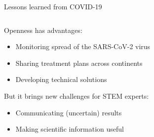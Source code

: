 
\begin{frame}{Lessons learned from COVID-19}

\begin{columns}[t]
    \begin{column}{.5\textwidth}   
        Openness has advantages:
        
        \begin{itemize}
            \item Monitoring spread of the SARS-CoV-2 virus
            \item Sharing treatment plans across continents
            \item Developing technical solutions
        \end{itemize}

    \vspace{1cm}

        But it brings new challenges for STEM experts:

        \begin{itemize}
            \item Communicating (uncertain) results
            \item Making scientific information useful
        \end{itemize}
    \end{column}

    \begin{column}{.4\textwidth}
        \vspace{-1cm}
    

\end{column}
\end{columns}
\end{frame}
